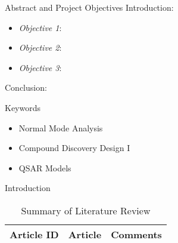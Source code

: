 


\setlength{\belowcaptionskip}{2ex}
\setlength\belowdisplayshortskip{2ex}
\begin{frame}[t]
\begin{columns}[t]
\begin{column}{\onecolwid} %
\begin{alertblock}{Abstract and Project Objectives}
Introduction:
\begin{itemize}
\item \textit{Objective 1}: 
\item \textit{Objective 2}: 
\item \textit{Objective 3}: 
\end{itemize}
Conclusion:
\end{alertblock}
\begin{block}{Keywords}
\begin{itemize}
\item Normal Mode Analysis
\item Compound Discovery Design I
\item QSAR Models
\end{itemize}	
\end{block}
\begin{alertblock}{Introduction}

\begin{table}[H]
	\centering
	\begin{tabular}{r|p{12cm}|l}
	\hline
	Article ID  & Article & Comments \\
	\hline
	\hline
	\end{tabular}
	\caption{Summary of Literature Review}
\end{table} 



\end{alertblock}
\end{column}
\end{columns}
\end{frame}
